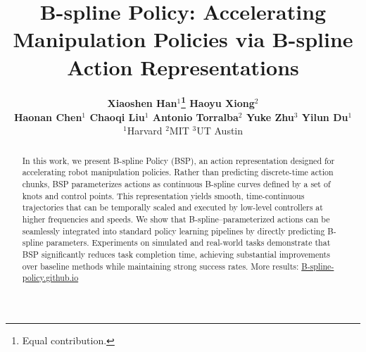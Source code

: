 \documentclass{article}
\title{B-spline Policy: Accelerating Manipulation Policies via B-spline Action Representations}
\author{
{\bfseries
Xiaoshen Han$^{1}$\thanks{Equal contribution.}
\quad
Haoyu Xiong$^{2}$\footnotemark[1]}\\[0.5em]
{\bfseries
Haonan Chen$^{1}$ \quad
Chaoqi Liu$^{1}$ \quad
Antonio Torralba$^{2}$ \quad
Yuke Zhu$^{3}$ \quad
Yilun Du$^{1}$}\\[0.5em]
{\normalfont
$^{1}$Harvard \quad
$^{2}$MIT \quad
$^{3}$UT Austin}
}
\begin{document}
\maketitle

\vspace{-20pt}
\begin{abstract} In this work, we present B-spline Policy (BSP), an action representation designed for accelerating robot manipulation policies. Rather than predicting discrete-time action chunks, BSP parameterizes actions as continuous B-spline curves defined by a set of knots and control points. This representation yields smooth, time-continuous trajectories that can be temporally scaled and executed by low-level controllers at higher frequencies and speeds. We show that B-spline–parameterized actions can be seamlessly integrated into standard policy learning pipelines by directly predicting B-spline parameters. Experiments on simulated and real-world tasks demonstrate that BSP significantly reduces task completion time, achieving substantial improvements over baseline methods while maintaining strong success rates.
More results: \href{https://b-spline-policy.github.io/}{B-spline-policy.github.io}
\end{abstract}







\clearpage




\end{document}
